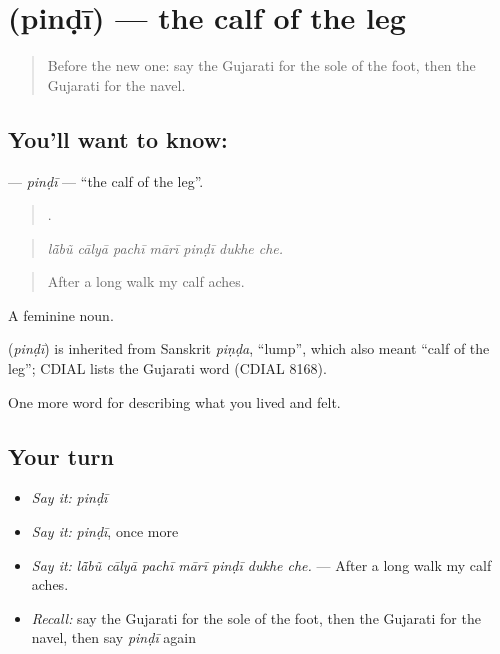 \section[\texorpdfstring{\gu{પિંડી} (pinḍī)}{પિંડી (pinḍī)}]{ (pinḍī) — the calf of the leg}

\label{lesson:GU-C473-pindi}



\begin{quote}
Before the new one: say the Gujarati for the sole of the foot, then the Gujarati for the navel.
\end{quote}

\subsection*{You'll want to know: }
\textbf{} — \emph{pinḍī} — \textquotedblleft{}the calf of the leg\textquotedblright{}.

\begin{quote}
      .
\end{quote}

\begin{quote}
\emph{lā̃bũ cālyā pachī mārī pinḍī dukhe che.}
\end{quote}

\begin{quote}
After a long walk my calf aches.
\end{quote}

A feminine noun.

\begin{cousinweb}
\textbf{} (\emph{pinḍī}) is inherited from Sanskrit \emph{piṇḍa}, \textquotedblleft{}lump\textquotedblright{}, which also meant \textquotedblleft{}calf of the leg\textquotedblright{}; CDIAL lists the Gujarati word (CDIAL 8168).
\end{cousinweb}

\begin{grammarlens}[title={What you've built}]
One more word for describing what you lived and felt.
\end{grammarlens}

\subsection*{Your turn}
\begin{itemize}
\raggedright
  \item \emph{Say it:} \emph{pinḍī}
  \item \emph{Say it:} \emph{pinḍī}, once more
  \item \emph{Say it:} \emph{lā̃bũ cālyā pachī mārī pinḍī dukhe che.} — After a long walk my calf aches.
  \item \emph{Recall:} say the Gujarati for the sole of the foot, then the Gujarati for the navel, then say \emph{pinḍī} again
\end{itemize}

